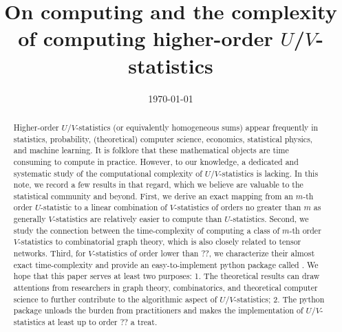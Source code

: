 \documentclass[letterpaper,11pt]{article}
\def\package{}
\begin{document}
\allowdisplaybreaks

\title{On computing and the complexity of computing higher-order $U$/$V$-statistics}

    
\date{\today}
    
\maketitle
    
\begin{abstract}
Higher-order $U$/$V$-statistics (or equivalently homogeneous sums) appear frequently in statistics, probability, (theoretical) computer science, economics, statistical physics, and machine learning. It is folklore that these mathematical objects are time consuming to compute in practice. However, to our knowledge, a dedicated and systematic study of the computational complexity of $U$/$V$-statistics is lacking. In this note, we record a few results in that regard, which we believe are valuable to the statistical community and beyond. First, we derive an exact mapping from an $m$-th order $U$-statistic to a linear combination of $V$-statistics of orders no greater than $m$ as generally $V$-statistics are relatively easier to compute than $U$-statistics. Second, we study the connection between the time-complexity of computing a class of $m$-th order $V$-statistics to combinatorial graph theory, which is also closely related to tensor networks. Third, for $V$-statistics of order lower than ??, we characterize their almost exact time-complexity and provide an easy-to-implement python package called \package{}. We hope that this paper serves at least two purposes: 1. The theoretical results can draw attentions from researchers in graph theory, combinatorics, and theoretical computer science to further contribute to the algorithmic aspect of $U$/$V$-statistics; 2. The python package \package{} unloads the burden from practitioners and makes the implementation of $U$/$V$-statistics at least up to order ?? a treat.
\end{abstract}
\end{document}
